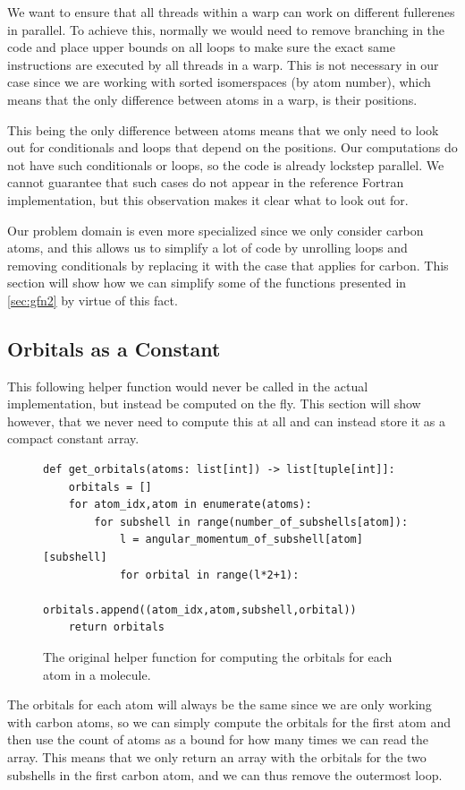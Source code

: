 We want to ensure that all threads within a warp can work on different fullerenes in parallel. To achieve this, normally we would need to remove branching in the code and place upper bounds on all loops to make sure the exact same instructions are executed by all threads in a warp. This is not necessary in our case since we are working with sorted isomerspaces (by atom number), which means that the only difference between atoms in a warp, is their positions.

This being the only difference between atoms means that we only need to look out for conditionals and loops that depend on the positions. Our computations do not have such conditionals or loops, so the code is already lockstep parallel. We cannot guarantee that such cases do not appear in the reference Fortran implementation, but this observation makes it clear what to look out for.

Our problem domain is even more specialized since we only consider carbon atoms, and this allows us to simplify a lot of code by unrolling loops and removing conditionals by replacing it with the case that applies for carbon. This section will show how we can simplify some of the functions presented in \autoref{sec:gfn2} by virtue of this fact.


\subsection{Orbitals as a Constant}

This following helper function would never be called in the actual implementation, but instead be computed on the fly. This section will show however, that we never need to compute this at all and can instead store it as a compact constant array. 

\begin{figure}[H]
\begin{verbatim}
def get_orbitals(atoms: list[int]) -> list[tuple[int]]:
    orbitals = []
    for atom_idx,atom in enumerate(atoms):
        for subshell in range(number_of_subshells[atom]):
            l = angular_momentum_of_subshell[atom][subshell] 
            for orbital in range(l*2+1):
                orbitals.append((atom_idx,atom,subshell,orbital))
    return orbitals
\end{verbatim}
\caption{The original helper function for computing the orbitals for each atom in a molecule.}
\end{figure}

The orbitals for each atom will always be the same since we are only working with carbon atoms, so we can simply compute the orbitals for the first atom and then use the count of atoms as a bound for how many times we can read the array. This means that we only return an array with the orbitals for the two subshells in the first carbon atom, and we can thus remove the outermost loop.

